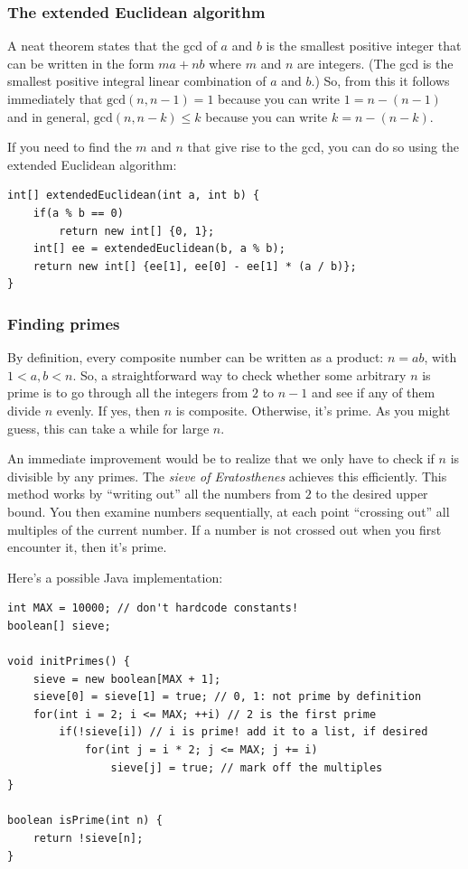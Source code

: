 \documentclass[a4paper,12pt]{article}
\begin{document}
\subsubsection{The extended Euclidean algorithm}
A neat theorem states that the gcd of $a$ and $b$ is the smallest positive integer that can be written in the form $ma+nb$ where $m$ and $n$ are integers. (The gcd is the smallest positive integral linear combination of $a$ and $b$.) So, from this it follows immediately that $\mathrm{gcd}(n,n-1)=1$ because you can write $1=n-(n-1)$ and in general, $\mathrm{gcd}(n,n-k)\le k$ because you can write $k=n-(n-k)$.

If you need to find the $m$ and $n$ that give rise to the gcd, you can do so using the extended Euclidean algorithm:
\begin{lstlisting}
int[] extendedEuclidean(int a, int b) {
	if(a % b == 0)
		return new int[] {0, 1};
	int[] ee = extendedEuclidean(b, a % b);
	return new int[] {ee[1], ee[0] - ee[1] * (a / b)};
}
\end{lstlisting}

\subsubsection{Finding primes}

By definition, every composite number can be written as a product: $n=ab$, with $1 < a,b < n$. So, a straightforward way to check whether some arbitrary $n$ is prime is to go through all the integers from $2$ to $n-1$ and see if any of them divide $n$ evenly. If yes, then $n$ is composite. Otherwise, it's prime. As you might guess, this can take a while for large $n$.

An immediate improvement would be to realize that we only have to check if $n$ is divisible by any primes. The {\em sieve of Eratosthenes} achieves this efficiently. This method works by ``writing out'' all the numbers from $2$ to the desired upper bound. You then examine numbers sequentially, at each point ``crossing out'' all multiples of the current number. If a number is not crossed out when you first encounter it, then it's prime. 

Here's a possible Java implementation:

\begin{lstlisting}
int MAX = 10000; // don't hardcode constants!
boolean[] sieve;

void initPrimes() {
	sieve = new boolean[MAX + 1];
	sieve[0] = sieve[1] = true; // 0, 1: not prime by definition
	for(int i = 2; i <= MAX; ++i) // 2 is the first prime
		if(!sieve[i]) // i is prime! add it to a list, if desired
			for(int j = i * 2; j <= MAX; j += i)
				sieve[j] = true; // mark off the multiples
}

boolean isPrime(int n) {
	return !sieve[n];
}
\end{lstlisting}
\end{document}
